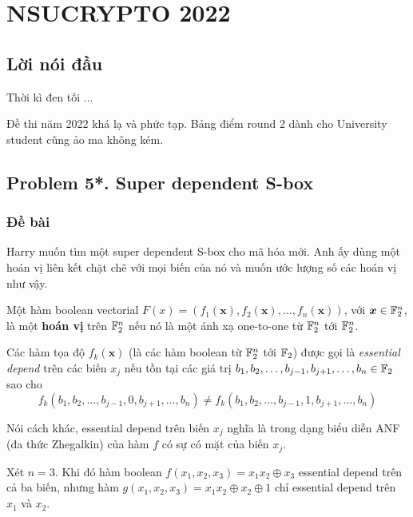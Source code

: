 \chapter{NSUCRYPTO 2022}

\section*{Lời nói đầu}

Thời kì đen tối ...

Đề thi năm 2022 khá lạ và phức tạp. Bảng điểm round 2 dành cho University student cũng ảo ma không kém.

\section*{Problem 5*. Super dependent S-box}

\subsection*{Đề bài}

Harry muốn tìm một super dependent S-box cho mã hóa mới. Anh ấy dùng một hoán vị liên kết chặt chẽ với mọi biến của nó và muốn ước lượng số các hoán vị như vậy.

Một hàm boolean vectorial $F(x) = (f_1(\bm{x}), f_2(\bm{x}), \ldots, f_n(\bm{x}))$, với $\bm{x} \in \mathbb{F}_2^n$, là một \textbf{hoán vị} trên $\mathbb{F}_2^n$ nếu nó là một ánh xạ one-to-one từ $\mathbb{F}_2^n$ tới $\mathbb{F}_2^n$.

Các hàm tọa độ $f_k(\bm{x})$ (là các hàm boolean từ $\mathbb{F}_2^n$ tới $\mathbb{F}_2$) được gọi là \textit{essential depend} trên các biến $x_j$ nếu tồn tại các giá trị $b_1, b_2, \ldots, b_{j-1}, b_{j+1}, \ldots, b_n \in \mathbb{F}_2$ sao cho
\begin{equation*}
    f_k(b_1, b_2, \ldots, b_{j-1}, 0, b_{j+1},  \ldots, b_n) \neq f_k(b_1, b_2, \ldots, b_{j-1}, 1, b_{j+1}, \ldots, b_n)
\end{equation*}

Nói cách khác, essential depend trên biến $x_j$ nghĩa là trong dạng biểu diễn ANF (đa thức Zhegalkin) của hàm $f$ có sự có mặt của biến $x_j$.

\begin{example}
    Xét $n=3$. Khi đó hàm boolean $f(x_1, x_2, x_3) = x_1 x_2 \oplus x_3$ essential depend trên cả ba biến, nhưng hàm $g(x_1, x_2, x_3) = x_1 x_2 \oplus x_2 \oplus 1$ chỉ essential depend trên $x_1$ và $x_2$.
\end{example}

